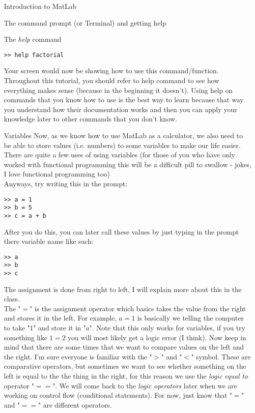 \documentclass[11pt, oneside]{report}   	%
\begin{document}
\begin{chapter}{Introduction to MatLab}
\begin{section}{The command prompt (or Terminal) and getting help}
\begin{subsection}{The \textit{help} command}
\begin{lstlisting}
>> help factorial
\end{lstlisting}

Your screen would now be showing how to use this command/function. Throughout this tutorial, you should refer to help command to see how everything makes sense
(because in the beginning it doesn't). Using help on commands that you know how to use is the best way to learn because that way you understand how their documentation
works and then you can apply your knowledge later to other commands that you don't know.

\end{subsection}

\begin{subsection}{Variables}
Now, as we know how to use MatLab as a calculator, we also need to be able to store values (i.e. numbers) to some variables to make our life easier. There are quite a few
uses of using variables (for those of you who have only worked with functional programming this will be a difficult pill to swallow - jokes, I love functional programming too)
\\

Anyways, try writing this in the prompt:

\begin{lstlisting}
>> a = 1
>> b = 5
>> c = a + b
\end{lstlisting}
After you do this, you can later call these values by just typing in the prompt there variable name like such:

\begin{lstlisting}
>> a
>> b
>> c
\end{lstlisting}
The assignment is done from right to left, I will explain more about this in the class.\\

The "$=$" is the assignment operator which basics takes the value from the right and stores it in the left. For example, $a = 1$ is basically we telling the computer to take
"$1$" and store it in "$a$". Note that this only works for variables, if you try something like $1 = 2$ you will most likely get a logic error (I think). Now keep in mind that there
are some times that we want to compare values on the left and the right. I'm sure everyone is familiar with the "$>$" and "$<$" symbol. These are comparative operators, but
sometimes we want to see whether something on the left is equal to the the thing in the right, for this reason we use the \textit{logic equal to} operator "$==$". We will come
back to the \textit{logic operators} later when we are working on control flow (conditional statements). For now, just know that "$=$" and "$==$" are different operators.


\end{subsection}
\end{section}
\end{chapter}
\end{document}
